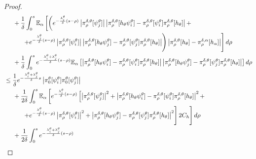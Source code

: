 \documentclass{article}
\begin{document}
\begin{proof}
\begin{align}
&\hspace{0.5cm}+\frac{1}{\delta}\int_{0}^{s}
\mathbb{E}_{\alpha}\left[\left(e^{-\frac{\lambda_i^{\theta}}{\delta}(s-\rho)}\left|\pi^{\delta,\theta}_{\rho}[\psi_{j}^{\theta}]\right|\left|\pi^{\delta,\theta}_{\rho}[h_{\theta}\psi_{i}^{\theta}]-\pi^{\delta,\theta}_{\rho}[\psi_{i}^{\theta}]\pi^{\delta,\theta}_{\rho}[h_{\theta}]   \right|+\right.\right.\nonumber\\
&\hspace{1cm}\left.\left.+e^{-\frac{\lambda_j^{\theta}}{\delta}(s-\rho)}\left|\pi^{\delta,\theta}_{\rho}[\psi_{i}^{\theta}]\right|\left|\pi^{\delta,\theta}_{\rho}[h_{\theta}\psi_{j}^{\theta}]-\pi^{\delta,\theta}_{\rho}[\psi_{j}^{\theta}]\pi^{\delta,\theta}_{\rho}[h_{\theta}]   \right|\right)\left|\pi^{\delta,\theta}_{\rho}[h_{\theta}]-\pi^{\delta,\alpha}_{\rho}[h_{\alpha}]\right|\right]d\rho\nonumber\\
&\hspace{0.5cm}+\frac{1}{\delta}\int_{0}^{s}e^{-\frac{\lambda_i^{\theta}+\lambda_j^{\theta}}{\delta}(s-\rho)}
\mathbb{E}_{\alpha}\left[\left|\pi^{\delta,\theta}_{\rho}[h_{\theta}\psi_{i}^{\theta}]-\pi^{\delta,\theta}_{\rho}[\psi_{i}^{\theta}]\pi^{\delta,\theta}_{\rho}[h_{\theta}]   \right|\left|\pi^{\delta,\theta}_{\rho}[h_{\theta}\psi_{j}^{\theta}]-\pi^{\delta,\theta}_{\rho}[\psi_{j}^{\theta}]\pi^{\delta,\theta}_{\rho}[h_{\theta}]   \right|\right]d\rho \nonumber\\
&\leq \frac{1}{\delta}e^{-\frac{\lambda_i^{\theta}+\lambda_j^{\theta}}{\delta}s}\left|\pi^{\theta}_{0}[\psi_{i}^{\theta}]\pi^{\theta}_{0}[\psi_{j}^{\theta}]\right|\nonumber\\
&\hspace{.5cm}+\frac{1}{2\delta}\int_{0}^{s}
\mathbb{E}_{\alpha}\left[e^{-\frac{\lambda_i^{\theta}}{\delta}(s-\rho)}\left[\left|\pi^{\delta,\theta}_{\rho}[\psi_{j}^{\theta}]\right|^2+\left|\pi^{\delta,\theta}_{\rho}[h_{\theta}\psi_{i}^{\theta}]-\pi^{\delta,\theta}_{\rho}[\psi_{i}^{\theta}]\pi^{\delta,\theta}_{\rho}[h_{\theta}]   \right|^2+\right.\right.\nonumber\\
&\hspace{1cm}\left.\left.+e^{-\frac{\lambda_j^{\theta}}{\delta}(s-\rho)}\left|\pi^{\delta,\theta}_{\rho}[\psi_{i}^{\theta}]\right|^2+\left|\pi^{\delta,\theta}_{\rho}[h_{\theta}\psi_{j}^{\theta}]-\pi^{\delta,\theta}_{\rho}[\psi_{j}^{\theta}]\pi^{\delta,\theta}_{\rho}[h_{\theta}]   \right|^2\right]2C_h\right]d\rho\nonumber\\
&\hspace{0.5cm}+\frac{1}{2\delta}\int_{0}^{s}e^{-\frac{\lambda_i^{\theta}+\lambda_j^{\theta}}{\delta}(s-\rho)}

\end{align}
\end{proof}
\end{document}
